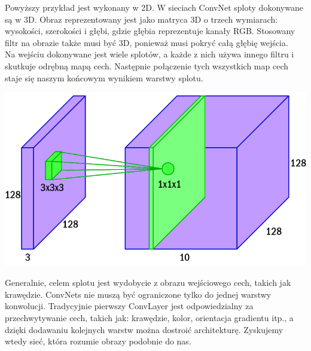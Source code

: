 \documentclass[12pt,a4paper]{article}
\begin{document}
        Powyższy przykład jest wykonany w 2D. W sieciach ConvNet sploty dokonywane są w 3D. Obraz reprezentowany jest jako matryca 3D o trzech wymiarach: wysokości, szerokości i głębi, gdzie głębia reprezentuje kanały RGB. Stosowany filtr na obrazie także musi być 3D, ponieważ musi pokryć całą głębię wejścia.
        \\
        
        Na wejściu dokonywane jest  wiele splotów, a każde z nich używa innego filtru i skutkuje odrębną mapą cech. Następnie połączenie tych wszystkich map cech staje się naszym końcowym wynikiem warstwy splotu.
        \begin{center}
            \includegraphics[scale=0.35]{3dkernel.png}
        \end{center}
        
        Generalnie, celem splotu jest wydobycie z obrazu wejściowego cech, takich jak krawędzie. ConvNets nie muszą być ograniczone tylko do jednej warstwy konwolucji. Tradycyjnie pierwszy ConvLayer jest odpowiedzialny za przechwytywanie cech, takich jak: krawędzie, kolor, orientacja gradientu itp., a dzięki dodawaniu kolejnych warstw można dostroić architekturę. Zyskujemy wtedy sieć, która  rozumie obrazy podobnie do nas.
        \\
        
\end{document}
